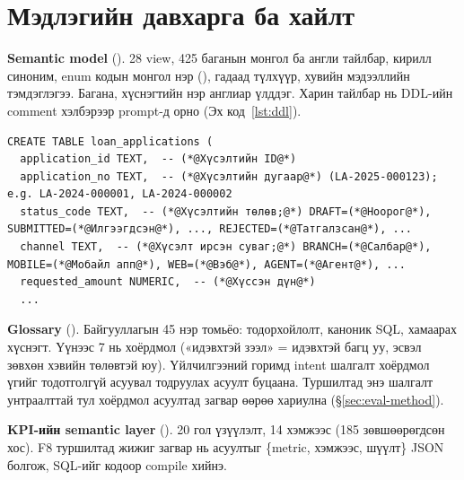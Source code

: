 \section{Мэдлэгийн давхарга ба хайлт}
\label{sec:knowledge}

\textbf{Semantic model} (). 28 view, 425 баганын монгол ба англи тайлбар,
кирилл синоним, enum кодын монгол нэр (), гадаад түлхүүр, хувийн мэдээллийн тэмдэглэгээ.
Багана, хүснэгтийн нэр англиар үлддэг. Харин тайлбар нь DDL-ийн comment хэлбэрээр prompt-д орно
(Эх код~\ref{lst:ddl}).

\begin{lstlisting}[language=SQLmn, basicstyle=\ttfamily\scriptsize, caption={B1-ийн тайлбартай DDL-ийн хэсэг (prompt-д орох хэлбэр, товчилсон)}, label={lst:ddl}]
CREATE TABLE loan_applications (
  application_id TEXT,  -- (*@Хүсэлтийн ID@*)
  application_no TEXT,  -- (*@Хүсэлтийн дугаар@*) (LA-2025-000123); e.g. LA-2024-000001, LA-2024-000002
  status_code TEXT,  -- (*@Хүсэлтийн төлөв;@*) DRAFT=(*@Ноорог@*), SUBMITTED=(*@Илгээгдсэн@*), ..., REJECTED=(*@Татгалзсан@*), ...
  channel TEXT,  -- (*@Хүсэлт ирсэн суваг;@*) BRANCH=(*@Салбар@*), MOBILE=(*@Мобайл апп@*), WEB=(*@Вэб@*), AGENT=(*@Агент@*), ...
  requested_amount NUMERIC,  -- (*@Хүссэн дүн@*)
  ...
\end{lstlisting}

\textbf{Glossary} (). Байгууллагын 45 нэр томьёо: тодорхойлолт, каноник SQL, хамаарах
хүснэгт. Үүнээс 7 нь хоёрдмол («идэвхтэй зээл» = идэвхтэй багц уу, эсвэл зөвхөн хэвийн төлөвтэй юу).
Үйлчилгээний горимд intent шалгалт хоёрдмол үгийг тодотголгүй асуувал тодруулах асуулт буцаана. Туршилтад энэ
шалгалт унтраалттай тул хоёрдмол асуултад загвар өөрөө хариулна (§\ref{sec:eval-method}).

\textbf{KPI-ийн semantic layer} (). 20 гол үзүүлэлт, 14 хэмжээс (185 зөвшөөрөгдсөн хос).
F8 туршилтад жижиг загвар нь асуултыг \{metric, хэмжээс, шүүлт\} JSON болгож, SQL-ийг кодоор compile хийнэ.

